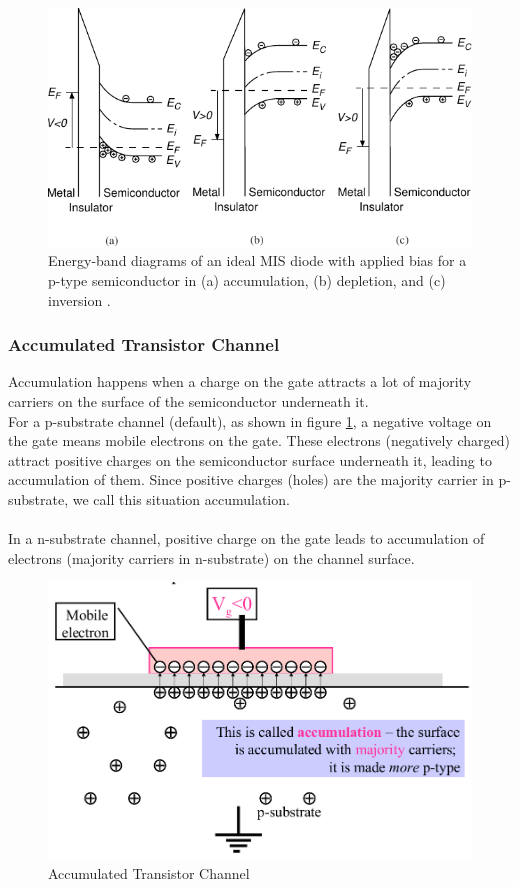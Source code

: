 \documentclass[main]{subfiles}
\begin{document}
\begin{figure}[H]
\centering
  \includegraphics[scale=1]{figs/operation_domains2.pdf}
  \caption{Energy-band diagrams of an ideal MIS diode with applied bias for a p-type semiconductor in (a) accumulation, (b) depletion, and (c) inversion \cite{book:VLSI}.}
\end{figure}

\subsubsection{Accumulated Transistor Channel}
Accumulation happens when a charge on the gate attracts a lot of majority carriers on the surface of the semiconductor underneath it.\\
For a p-substrate channel (default), as shown in figure \ref{fig:channel_accumulated}, a negative voltage on the gate means mobile electrons on the gate. These electrons (negatively charged) attract positive charges on the semiconductor surface underneath it, leading to accumulation of them. Since positive charges (holes) are the majority carrier in p-substrate, we call this situation accumulation.\\\\
In a n-substrate channel, positive charge on the gate leads to accumulation of electrons (majority carriers in n-substrate) on the channel surface.
\begin{figure}[H]
  \centering
  \includegraphics[scale=1]{figs/channel_accumulation.png}
  \caption{Accumulated Transistor Channel \cite{lec2}}
  \label{fig:channel_accumulated}
\end{figure}
\end{document}
